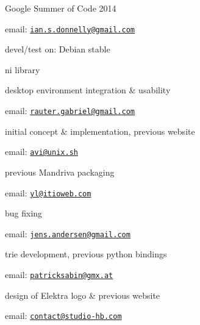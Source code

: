 Google Summer of Code 2014


\begin{DoxyItemize}
\item email\+: \href{mailto:ian.s.donnelly@gmail.com}{\tt ian.\+s.\+donnelly@gmail.\+com}
\item devel/test on\+: Debian stable
\end{DoxyItemize}

ni library

desktop environment integration \& usability


\begin{DoxyItemize}
\item email\+: \href{mailto:rauter.gabriel@gmail.com}{\tt rauter.\+gabriel@gmail.\+com}
\end{DoxyItemize}

initial concept \& implementation, previous website


\begin{DoxyItemize}
\item email\+: \href{mailto:avi@unix.sh}{\tt avi@unix.\+sh}
\end{DoxyItemize}

previous Mandriva packaging


\begin{DoxyItemize}
\item email\+: \href{mailto:yl@itioweb.com}{\tt yl@itioweb.\+com}
\end{DoxyItemize}

bug fixing


\begin{DoxyItemize}
\item email\+: \href{mailto:jens.andersen@gmail.com}{\tt jens.\+andersen@gmail.\+com}
\end{DoxyItemize}

trie development, previous python bindings


\begin{DoxyItemize}
\item email\+: \href{mailto:patricksabin@gmx.at}{\tt patricksabin@gmx.\+at}
\end{DoxyItemize}

design of Elektra logo \& previous website


\begin{DoxyItemize}
\item email\+: \href{mailto:contact@studio-hb.com}{\tt contact@studio-\/hb.\+com}
\end{DoxyItemize}

